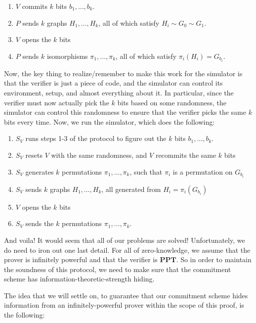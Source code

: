 \documentclass[11pt]{article}
\newcommand{\PPT}{\mathbf{PPT}}
\begin{document}
\begin{enumerate}
\item \(V\) commits \(k\) bits \(b_1,\ldots,b_k\).
\item \(P\) sends \(k\) graphs \(H_1,\ldots,H_k\), all of which satisfy \(H_i\sim G_0\sim G_1\).
\item \(V\) opens the \(k\) bits
\item \(P\) sends \(k\) isomorphisms \(\pi_1,\ldots,\pi_k\), all of which satisfy \(\pi_i(H_i)=G_{b_i}\).
\end{enumerate}

Now, the key thing to realize/remember to make this work for the simulator is that the verifier is just a piece of code, and the simulator can control its environment, setup, and almost everything about it. In particular, since the verifier must now actually pick the \(k\) bits based on some randomness, the simulator can control this randomness to ensure that the verifier picks the same \(k\) bits every time. Now, we run the simulator, which does the following:

\begin{enumerate}
\item \(S_V\) runs steps 1-3 of the protocol to figure out the \(k\) bits \(b_1,\ldots,b_k\).
\item \(S_V\) resets \(V\) with the same randomness, and \(V\) recommits the same \(k\) bits
\item \(S_V\) generates \(k\) permutations \(\pi_1,\ldots,\pi_k\), such that \(\pi_i\) is a permutation on \(G_{b_i}\)
\item \(S_V\) sends \(k\) graphs \(H_1,\ldots, H_k\), all generated from \(H_i=\pi_i(G_{b_i})\)
\item \(V\) opens the \(k\) bits
\item \(S_V\) sends the \(k\) permutations \(\pi_1,\ldots,\pi_k\).
\end{enumerate}

And voila! It would seem that all of our problems are solved! Unfortunately, we do need to iron out one last detail. For all of zero-knowledge, we assume that the prover is infinitely powerful and that the verifier is \(\PPT\). So in order to maintain the soundness of this protocol, we need to make sure that the commitment scheme has information-theoretic-strength hiding.\bigskip

The idea that we will settle on, to guarantee that our commitment scheme hides information from an infinitely-powerful prover within the scope of this proof, is the following:\medskip
\end{document}
